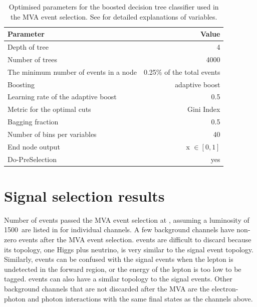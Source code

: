 \begin{table}[!htbp]\centering

\begin{tabular}{lr}
\hline \hline
 Parameter &  Value \\
\hline
Depth of tree & 4 \\
Number of trees & 4000 \\
The minimum number of events in a node &  0.25\% of the total events \\
Boosting & adaptive boost \\
Learning rate of the adaptive boost & 0.5 \\
Metric for the optimal cuts & Gini Index \\
Bagging fraction & 0.5 \\
Number of bins per variables & 40 \\
End node output & x $\in [0,1]$ \\
Do-PreSelection & yes \\
\hline \hline
\end{tabular}

\caption
{Optimised parameters for the boosted decision tree classifier used in the MVA event selection. See  for detailed explanations of variables.}
\label{tab:doubleHiggsBDTparameters}
\end{table}

\section{Signal selection results}
\label{sec:doubleHiggsSignalSelResult}

Number of events passed the MVA event selection at , assuming a luminosity of 1500\,  are listed in  for individual channels. A few  background channels have non-zero events after the MVA event selection. \eeTo{\Pquark \APquark \PHiggs \Pnu \APnu} events are difficult to discard because its topology, one Higgs plus neutrino, is very similar to the signal event topology. Similarly, \eeTo{ \Pquark \Pquark \Pquark \Pquark \Plepton \Pnu} events can be confused with the signal events when the lepton is undetected in the forward region, or the energy of the lepton is too low to be tagged. \eeTo{ \Pquark \Pquark \Pquark \Pquark \Pnu \APnu} events can also have a similar topology to the signal events. Other background channels that are not discarded after the MVA are the electron-photon and photon interactions with the same final states as the channels above.


